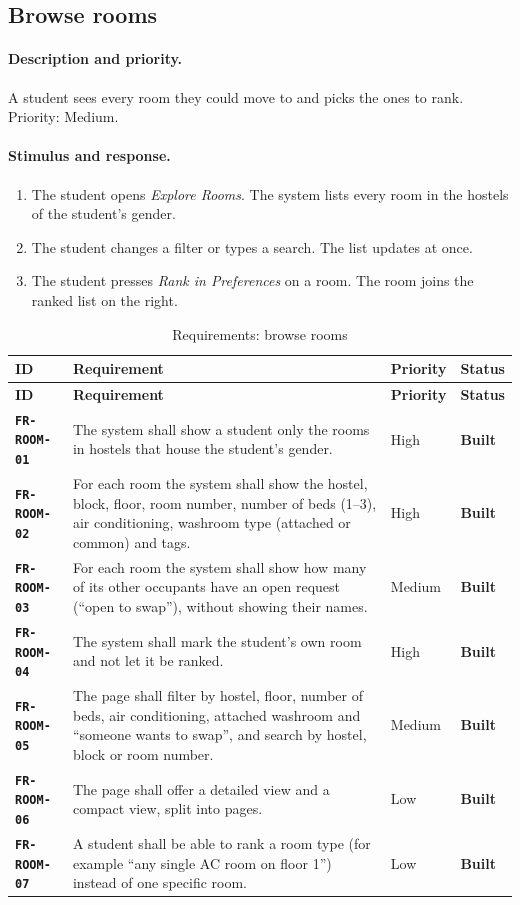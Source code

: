 \documentclass[11pt,a4paper,parskip=half,toc=listof]{scrreprt}
\newcommand{\Built}{\textcolor{builtgreen}{\textbf{Built}}}
\newcommand{\Req}[1]{\textbf{\texttt{#1}}}
\newcommand{\ReqHeader}{%
  \toprule
  \textbf{ID} & \textbf{Requirement} & \textbf{Priority} & \textbf{Status}\\
  \midrule}
\begin{document}
\subsection{Browse rooms}

\paragraph{Description and priority.} A student sees every room they could
move to and picks the ones to rank. Priority: Medium.

\paragraph{Stimulus and response.}
\begin{enumerate}
  \item The student opens \emph{Explore Rooms}. The system lists every room
    in the hostels of the student's gender.
  \item The student changes a filter or types a search. The list updates
    at once.
  \item The student presses \emph{Rank in Preferences} on a room. The room
    joins the ranked list on the right.
\end{enumerate}

\begin{xltabular}{\linewidth}{@{}L{2.25cm}YL{1.55cm}L{1.6cm}@{}}
  \caption{Requirements: browse rooms}\label{tab:fr-room}\\
  \ReqHeader
  \endfirsthead
  \ReqHeader
  \endhead
  \bottomrule
  \endlastfoot
  \Req{FR-ROOM-01} & The system shall show a student only the rooms in
    hostels that house the student's gender. & High & \Built\\
  \Req{FR-ROOM-02} & For each room the system shall show the hostel,
    block, floor, room number, number of beds (1--3), air conditioning,
    washroom type (attached or common) and tags. & High & \Built\\
  \Req{FR-ROOM-03} & For each room the system shall show how many of its
    other occupants have an open request (``open to swap''), without
    showing their names. & Medium & \Built\\
  \Req{FR-ROOM-04} & The system shall mark the student's own room and not
    let it be ranked. & High & \Built\\
  \Req{FR-ROOM-05} & The page shall filter by hostel, floor, number of
    beds, air conditioning, attached washroom and ``someone wants to
    swap'', and search by hostel, block or room number. & Medium &
    \Built\\
  \Req{FR-ROOM-06} & The page shall offer a detailed view and a compact
    view, split into pages. & Low & \Built\\
  \Req{FR-ROOM-07} & A student shall be able to rank a room type (for
    example ``any single AC room on floor 1'') instead of one specific
    room. & Low & \Built\\
\end{xltabular}
\end{document}
